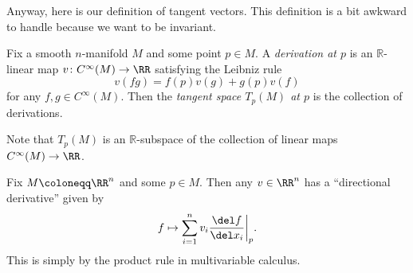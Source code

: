 \documentclass[../notes.tex]{subfiles}
\begin{document}
Anyway, here is our definition of tangent vectors. This definition is a bit awkward to handle because we want to be invariant.
\begin{definition}
	Fix a smooth $n$-manifold $M$ and some point $p\in M$. A \textit{derivation at $p$} is an $\mathbb R$-linear map $v\colon C^\infty(M)\to\RR$ satisfying the Leibniz rule
	\[v(fg)=f(p)v(g)+g(p)v(f)\]
	for any $f,g\in C^\infty(M)$. Then the \textit{tangent space $T_p(M)$ at $p$} is the collection of derivations.
\end{definition}
\begin{remark}
	Note that $T_p(M)$ is an $\mathbb R$-subspace of the collection of linear maps $C^\infty(M)\to\RR$.
\end{remark}
\begin{example} \label{ex:directional-deriv}
	Fix $M\coloneqq\RR^n$ and some $p\in M$. Then any $v\in\RR^n$ has a ``directional derivative'' given by
	\[f\mapsto\sum_{i=1}^nv_i\frac{\del f}{\del x_i}\bigg|_p.\]
	This is simply by the product rule in multivariable calculus.
\end{example}
\end{document}
